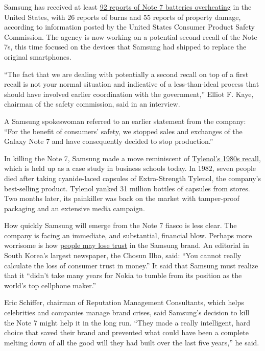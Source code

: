 Samsung has received at least
\href{https://www.cpsc.gov/Recalls/2016/Samsung-Recalls-Galaxy-Note7-Smartphones/}{92
reports of Note 7 batteries overheating} in the United States, with 26
reports of burns and 55 reports of property damage, according to
information posted by the United States Consumer Product Safety
Commission. The agency is now working on a potential second recall of
the Note 7s, this time focused on the devices that Samsung had shipped
to replace the original smartphones.

``The fact that we are dealing with potentially a second recall on top
of a first recall is not your normal situation and indicative of a
less-than-ideal process that should have involved earlier coordination
with the government,'' Elliot F. Kaye, chairman of the safety
commission, said in an interview.

A Samsung spokeswoman referred to an earlier statement from the company:
``For the benefit of consumers' safety, we stopped sales and exchanges
of the Galaxy Note 7 and have consequently decided to stop production.''

In killing the Note 7, Samsung made a move reminiscent of
\href{http://mobile.nytimes3xbfgragh.onion/2002/03/23/your-money/tylenol-made-a-hero-of-johnson-johnson-the-recall-that-started.html}{Tylenol's
1980s recall}, which is held up as a case study in business schools
today. In 1982, seven people died after taking cyanide-laced capsules of
Extra-Strength Tylenol, the company's best-selling product. Tylenol
yanked 31 million bottles of capsules from stores. Two months later, its
painkiller was back on the market with tamper-proof packaging and an
extensive media campaign.

How quickly Samsung will emerge from the Note 7 fiasco is less clear.
The company is facing an immediate, and substantial, financial blow.
Perhaps more worrisome is how
\href{http://www.nytimes3xbfgragh.onion/2016/10/12/technology/personaltech/do-you-have-a-samsung-galaxy-note-7-heres-what-to-do.html}{people
may lose trust} in the Samsung brand. An editorial in South Korea's
largest newspaper, the Chosun Ilbo, said: ``You cannot really calculate
the loss of consumer trust in money.'' It said that Samsung must realize
that it ``didn't take many years for Nokia to tumble from its position
as the world's top cellphone maker.''

Eric Schiffer, chairman of Reputation Management Consultants, which
helps celebrities and companies manage brand crises, said Samsung's
decision to kill the Note 7 might help it in the long run. ``They made a
really intelligent, hard choice that saved their brand and prevented
what could have been a complete melting down of all the good will they
had built over the last five years,'' he said.

